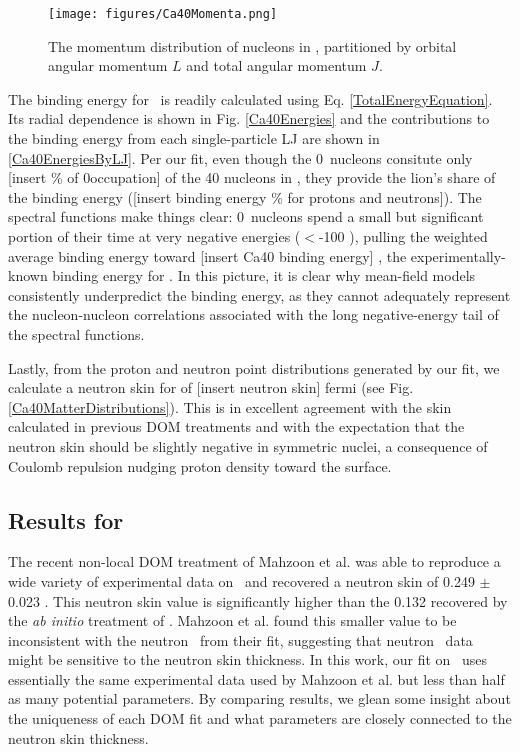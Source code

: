 \begin{figure}[tb]
    \centering
    \texttt{[image: figures/Ca40Momenta.png]}
    \caption[The single-particle momentum distributions in \caForty]
    {
        The momentum distribution of nucleons in \caForty, partitioned
        by orbital angular momentum $L$ and total angular momentum $J$.
    }
    \label{Ca40Momenta}
\end{figure}

The binding energy for \caForty\ is readily calculated using Eq.
\ref{TotalEnergyEquation}. Its radial dependence is shown in Fig. \ref{Ca40Energies} and the
contributions to the binding energy from each single-particle LJ are shown in
\ref{Ca40EnergiesByLJ}. Per our fit, even though the 0\sOne\ nucleons consitute only [insert \%
of 0\sOne occupation] of the 40 nucleons in \caForty, they provide the lion's share of the binding
energy ([insert binding energy \% for protons and neutrons]). The spectral
functions make things clear: 0\sOne\ nucleons spend a small but significant portion of their time 
at very negative energies ($<$-100 \mega\electronvolt), pulling the weighted average binding energy toward
[insert Ca40 binding energy] \mega\electronvolt{}, the experimentally-known binding energy for \caForty. In this
picture, it is clear why mean-field models consistently underpredict the binding energy, as they
cannot adequately represent the nucleon-nucleon correlations associated with the long
negative-energy tail of the spectral functions.

Lastly, from the proton and neutron point distributions generated by our fit, we calculate a
\caForty neutron skin for of [insert neutron skin] fermi (see Fig. \ref{Ca40MatterDistributions}). 
This is in excellent agreement with the skin calculated in previous DOM treatments
\cite{MahzoonPhDThesis} and with the expectation that the neutron skin should be slightly negative in
symmetric nuclei, a consequence of Coulomb repulsion nudging proton density toward the surface.

\subsection{Results for \caEight}
The recent non-local DOM treatment of Mahzoon et al. \cite{Mahzoon2017} was able
to reproduce a wide variety of
experimental data on \caEight\ and recovered a neutron skin of 0.249 $\pm$ 0.023 \femto\meter.
This neutron skin value is significantly higher than the 0.132 \femto\meter recovered by
the \textit{ab initio} treatment of \cite{Hagen2016}. Mahzoon et al. found this smaller value
to be inconsistent with the neutron \tot\ from their fit, suggesting that neutron \tot\ data might
be sensitive to the neutron skin thickness. In this work, our fit on \caEight\ uses essentially the 
same experimental data used by Mahzoon et al. but less than half as many potential parameters.
By comparing results, we glean some insight about the uniqueness of each DOM fit and what parameters
are closely connected to the neutron skin thickness.

